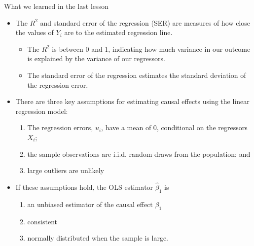 \documentclass[notes,10pt, aspectratio=169]{beamer}
\begin{document}
\begin{frame}{What we learned in the last lesson}
\begin{itemize}
    \item The $R^2$ and standard error of the regression (SER) are measures of how close the values of $Y_i$ are to the estimated regression line.\\
    \begin{itemize}
        \item The $R^2$ is between 0 and 1, indicating how much variance in our outcome is explained by the variance of our regressors.
        \item The standard error of the regression estimates the standard deviation of the regression error.
    \end{itemize}
    \vspace{1em}
    \item There are three key assumptions for estimating causal effects using the linear regression model:
    \begin{enumerate}
        \item The regression errors, $u_i$, have a mean of 0, conditional on the regressors $X_i$;
        \item the sample observations are i.i.d. random draws from the population; and 
        \item large outliers are unlikely
    \end{enumerate}
    \vspace{1em}
   \item If these assumptions hold, the OLS estimator $\hat{\beta}_1$ is 
    \begin{enumerate}
        \item  an unbiased estimator of the causal effect ${\beta}_1$
        \item consistent
        \item normally distributed when the sample is large.
    \end{enumerate}
\end{itemize}
\end{frame}
\end{document}
